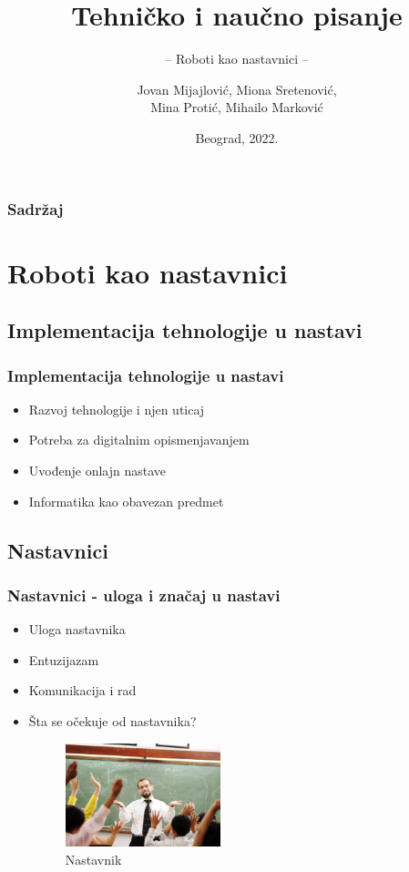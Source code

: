\documentclass[10pt]{beamer}
\title{Tehničko i naučno pisanje}
\subtitle{-- Roboti kao nastavnici --}
\author{Jovan Mijajlović, Miona Sretenović,\\ Mina Protić, Mihailo Marković}
\institute{Matematički fakultet\\Univerzitet u Beogradu}
\date{
	\footnotesize{Beograd, 2022.}	
}
\begin{document}
\begin{frame}
	\thispagestyle{empty}
	\titlepage
\end{frame}

\addtocounter{framenumber}{-1}

\begin{frame}[fragile]\frametitle{Sadržaj}
	\tableofcontents[]
\end{frame}

\section{Roboti kao nastavnici}

\subsection{Implementacija tehnologije u nastavi}

\begin{frame}[fragile]\frametitle{Implementacija tehnologije u nastavi}
	\begin{itemize}
	\item Razvoj tehnologije i njen uticaj
	\item Potreba za digitalnim opismenjavanjem
    \item Uvođenje onlajn nastave
    \item Informatika kao obavezan predmet
	\end{itemize}
\end{frame}

\subsection{Nastavnici}

\begin{frame}[fragile]\frametitle{Nastavnici - uloga i značaj u nastavi}
	\begin{itemize}	
        \item Uloga nastavnika
        \item Entuzijazam
        \item Komunikacija i rad
        \item Šta se očekuje od nastavnika?
        \begin{figure}[h!]
        \centering\includegraphics[height=3cm]{nastavnik.jpg} 
        \caption{Nastavnik}
        \label{fig:nastavnik}
        \end{figure}
 \end{itemize}
\end{frame}
\end{document}
